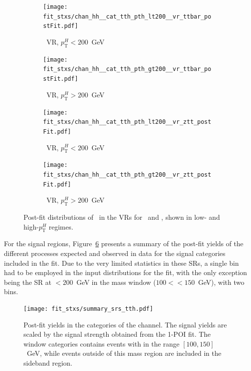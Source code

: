 \begin{figure}[htbp]
  \centering

  \begin{subfigure}[b]{0.48\textwidth}
    \centering
    \texttt{[image: fit\_stxs/chan\_hh\_\_cat\_tth\_pth\_lt200\_\_vr\_ttbar\_postFit.pdf]}
    \caption{\small \ttbar\ VR, $p_{\text{T}}^{H}<200$~GeV}
    \label{fig:postfit_vr_ttbar_lt200}
  \end{subfigure}\hfill
  \begin{subfigure}[b]{0.48\textwidth}
    \centering
    \texttt{[image: fit\_stxs/chan\_hh\_\_cat\_tth\_pth\_gt200\_\_vr\_ttbar\_postFit.pdf]}
    \caption{\small \ttbar\ VR, $p_{\text{T}}^{H}>200$~GeV}
    \label{fig:postfit_vr_ttbar_gt200}
  \end{subfigure}

  \vspace{0.45cm}

  \begin{subfigure}[b]{0.48\textwidth}
    \centering
    \texttt{[image: fit\_stxs/chan\_hh\_\_cat\_tth\_pth\_lt200\_\_vr\_ztt\_postFit.pdf]}
    \caption{\small \ztautau\ VR, $p_{\text{T}}^{H}<200$~GeV}
    \label{fig:postfit_vr_ztt_lt200}
  \end{subfigure}\hfill
  \begin{subfigure}[b]{0.48\textwidth}
    \centering
    \texttt{[image: fit\_stxs/chan\_hh\_\_cat\_tth\_pth\_gt200\_\_vr\_ztt\_postFit.pdf]}
    \caption{\small \ztautau\ VR, $p_{\text{T}}^{H}>200$~GeV}
    \label{fig:postfit_vr_ztt_gt200}
  \end{subfigure}

  \caption{Post-fit distributions of \mtt\ in the VRs for \ttbar\ and \ztautau, shown in low- and high-$p_{\text{T}}^{H}$ regimes.}
  \label{fig:postfit_vr_all}
\end{figure}

For the signal regions, Figure~\ref{fig:summary_all} presents a summary of the post-fit yields of the different processes expected and observed in data for the \ttHtt signal categories included in the fit. Due to the very limited statistics in these SRs, a single bin had to be employed in the input distributions for the fit, with the only exception being the SR at \pth$<200$~GeV in the mass window ($100<$\mtt$<150$~GeV), with two bins.

\begin{figure}[htbp]
  \centering
  \texttt{[image: fit\_stxs/summary\_srs\_tth.pdf]}
  \caption{Post-fit yields in the \ttH categories of the \tauhadhad channel. The
  signal yields are scaled by the signal strength obtained from the 1-POI fit. The
  window categories contains events with \mtt in the range $[100, 150]$~GeV, while
  events outside of this mass region are included in the sideband region.}
  \label{fig:summary_all}
\end{figure}



